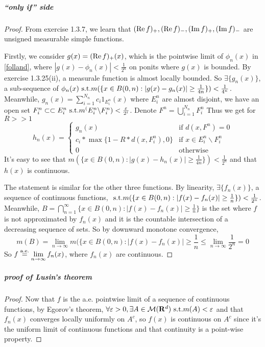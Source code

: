 \documentclass{article}
\begin{document}
\subparagraph{``only if'' side}
\begin{proof}
From exercise 1.3.7, we learn that $(\mathrm{Re}\, f)_+,(\mathrm{Re}\, f)_-,(\mathrm{Im}\, f)_+,(\mathrm{Im}\, f)_-$ are unsigned measurable simple functions. 

Firstly, we consider $g(x)=(\mathrm{Re}\, f)_+(x)$, which is the pointwise limit of $\phi_n(x)$ in \ref{folland}, where $|g(x)-\phi_n(x)|<\frac 1 {2^n}$ on ponits where $g(x)$ is bounded. By exercise 1.3.25(ii), a measurale function is almost locally bounded. So $\exists \{g_n(x)\}$, a sub-sequence of $\phi_n(x)\text{ s.t.} m(\{x\in B(0,n):|g(x)-g_n(x)|\geq \frac 1 {4n}\})<\frac {1}{4^n}$. 
Meanwhile, $g_n(x)=\sum_{i=1}^{N_n}c_i1_{E_i^n}(x)$ where $E_i^n$ are almost disjoint, we have an open set $F_i^n\subset\subset E_i^n \text{ s.t.} m^(E_i^n\backslash F_i^n)<\frac{\varepsilon}{2^i}$. Denote $F^n=\bigcup\limits_{i=1}^{N_n}F^n_i $ Thus we get for $R>>1$
\[h_n(x)=\begin{cases}
g_n(x)& \text{if } d(x,F^n)=0\\
c_i*\max\{1-R*d(x,F^n_i),0\}& \text{if } x\in E_i^n\backslash F_i^n\\
0&\text{otherwise}
\end{cases}\]
It's easy to see that $m(\{x\in B(0,n):|g(x)-h_n(x)|\geq \frac 1 {4n}\})<\frac {1}{2^n}$ and that $h(x)$ is continuous.

The statement is similar for the other three functions. By linearity, $\exists \{f_n(x)\}$, a sequence of continuous functions, $\text{ s.t.} m(\{x\in B(0,n):|f(x)-f_n(x)|\geq \frac 1 n\})<\frac {1}{2^n}$. Meanwhile, $B=\bigcap_{n=1}^{\infty}\{x\in B(0,n):|f(x)-f_n(x)|\geq \frac 1 n\}$ is the set where $f$ is not approximated by $f_n(x)$ and it is the countable intersection of a decreasing sequence of sets. So by downward monotone convergence, 
\[m(B)=\lim_{n\to\infty}m(\{x\in B(0,n):|f(x)-f_n(x)|\geq \frac 1 n\leq \lim_{n\to\infty}\frac {1}{2^n}=0\]
So $f\stackrel{\mathrm{a.e.}}{=} \lim\limits_{n\to\infty}f_n(x)$, where $f_n(x)$ are continuous.
\end{proof}
\subparagraph{proof of Lusin's theorem}
\begin{proof}
Now that $f$ is the a.e. pointwise limit of a sequence of continuous functions, by Egorov's theorem, $\forall \varepsilon>0,\exists A\in\mathcal{M}(\mathbf{R}^d)\text{ s.t.} m(A)<\varepsilon$ and that $f_n(x)$ converges locally uniformly on $A^c$, so $f(x)$ is continuous on $A^c$ since it's the uniform limit of continuous functions and that continuity is a point-wise property. 
\end{proof}
\end{document}

